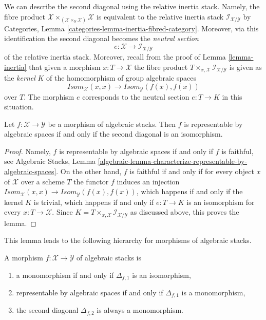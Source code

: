 \medskip\noindent
We can describe the second diagonal using the relative inertia stack.
Namely, the fibre product
$\mathcal{X}
\times_{(\mathcal{X} \times_\mathcal{Y} \mathcal{X})} \mathcal{X}$
is equivalent to the relative inertia stack
$\mathcal{I}_{\mathcal{X}/\mathcal{Y}}$ by
Categories, Lemma \ref{categories-lemma-inertia-fibred-category}.
Moreover, via this identification the second diagonal becomes the
{\it neutral section}
$$
e : \mathcal{X} \to \mathcal{I}_{\mathcal{X}/\mathcal{Y}}
$$
of the relative inertia stack. Moreover, recall from the proof of
Lemma \ref{lemma-inertia}
that given a morphism $x : T \to \mathcal{X}$ the fibre product
$T \times_{x, \mathcal{X}} \mathcal{I}_{\mathcal{X}/\mathcal{Y}}$
is given as the {\it kernel} $K$ of the homomorphism of group algebraic spaces
$$
\mathit{Isom}_\mathcal{X}(x, x)
\longrightarrow
\mathit{Isom}_\mathcal{Y}(f(x), f(x))
$$
over $T$. The morphism $e$ corresponds to the neutral section
$e : T \to K$ in this situation.

\begin{lemma}
\label{lemma-second-diagonal}
Let $f : \mathcal{X} \to \mathcal{Y}$ be a morphism of algebraic stacks.
Then $f$ is representable by algebraic spaces if and only if
the second diagonal is an isomorphism.
\end{lemma}

\begin{proof}
Namely, $f$ is representable by algebraic spaces if and only if $f$ is
faithful, see
Algebraic Stacks,
Lemma \ref{algebraic-lemma-characterize-representable-by-algebraic-spaces}.
On the other hand, $f$ is faithful if and only if for every object $x$
of $\mathcal{X}$ over a scheme $T$ the functor $f$ induces an injection
$\mathit{Isom}_\mathcal{X}(x, x) \to
\mathit{Isom}_\mathcal{Y}(f(x), f(x))$,
which happens if and only if the kernel $K$ is trivial, which happens if and
only if $e : T \to K$ is an isomorphism for every $x : T \to \mathcal{X}$.
Since $K = T \times_{x, \mathcal{X}} \mathcal{I}_{\mathcal{X}/\mathcal{Y}}$
as discussed above, this proves the lemma.
\end{proof}

\noindent
This lemma leads to the following hierarchy for
morphisms of algebraic stacks.

\begin{lemma}
\label{lemma-hierarchy}
A morphism $f : \mathcal{X} \to \mathcal{Y}$ of algebraic stacks is
\begin{enumerate}
\item a monomorphism if and only if $\Delta_{f, 1}$ is an isomorphism,
\item representable by algebraic spaces if and only if $\Delta_{f, 1}$
is a monomorphism,
\item the second diagonal $\Delta_{f, 2}$ is always a monomorphism.
\end{enumerate}
\end{lemma}

